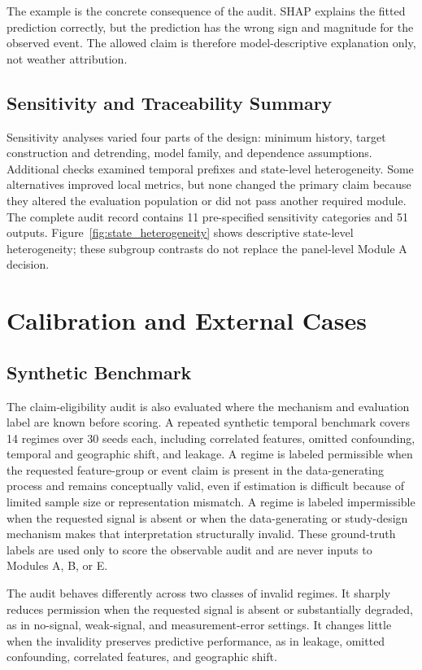 \documentclass[conference]{IEEEtran}
\begin{document}
The example is the concrete consequence of the audit. SHAP explains the fitted
prediction correctly, but the prediction has the wrong sign and magnitude for
the observed event. The allowed claim is therefore model-descriptive explanation
only, not weather attribution.

\subsection{Sensitivity and Traceability Summary}
Sensitivity analyses varied four parts of the design: minimum history, target
construction and detrending, model family, and dependence assumptions. Additional
checks examined temporal prefixes and state-level heterogeneity. Some
alternatives improved local metrics, but none changed the primary claim because
they altered the evaluation population or did not pass another required module. The
complete audit record contains 11 pre-specified sensitivity categories and 51
outputs.
Figure~\ref{fig:state_heterogeneity} shows descriptive state-level heterogeneity;
these subgroup contrasts do not replace the panel-level Module A decision.

\FloatBarrier
\section{Calibration and External Cases}
\subsection{Synthetic Benchmark}
The claim-eligibility audit is also evaluated where the mechanism and evaluation
label are known before scoring. A repeated synthetic temporal benchmark covers 14
regimes over 30 seeds each, including correlated features, omitted confounding,
temporal and geographic shift, and leakage. A regime is labeled permissible when
the requested feature-group or event claim is present in the data-generating
process and remains conceptually valid, even if estimation is difficult because
of limited sample size or representation mismatch. A regime is labeled
impermissible when the requested signal is absent or when the data-generating or
study-design mechanism makes that interpretation structurally invalid. These
ground-truth labels are used only to score the observable audit and are never
inputs to Modules A, B, or E.

The audit behaves differently across two classes of invalid regimes. It sharply
reduces permission when the requested signal is absent or substantially degraded,
as in no-signal, weak-signal, and measurement-error settings. It changes little
when the invalidity preserves predictive performance, as in leakage, omitted
confounding, correlated features, and geographic shift.
\end{document}
